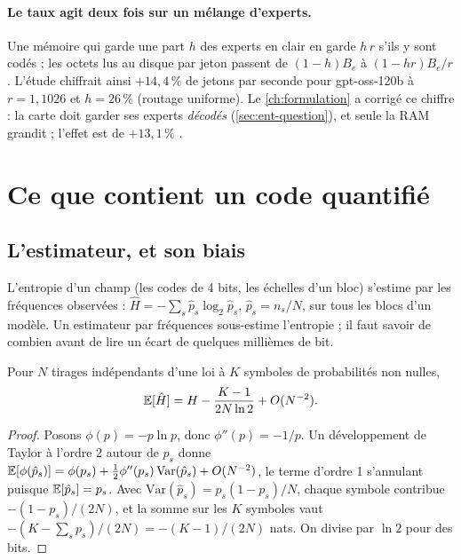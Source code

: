 \paragraph{Le taux agit deux fois sur un mélange d'experts.} Une mémoire qui garde une part $h$ des experts en clair en garde $h\,r$ s'ils y sont codés ; les octets lus au disque par jeton passent de $(1-h)B_e$ à $(1-hr)B_e/r$. L'étude chiffrait ainsi $+14{,}4\,\%$ de jetons par seconde pour gpt-oss-120b à $r = 1{,}1026$ et $h = 26\,\%$ (routage uniforme).  Le \cref{ch:formulation} a corrigé ce chiffre : la carte doit garder ses experts \emph{décodés} (\cref{sec:ent-question}), et seule la RAM grandit ; l'effet est de $+13{,}1\,\%$ \calc.

\section{Ce que contient un code quantifié}\label{sec:ent-contenu}

\subsection{L'estimateur, et son biais}

L'entropie d'un champ (les codes de 4 bits, les échelles d'un bloc) s'estime par les fréquences observées : $\hat H = -\sum_s \hat p_s \log_2 \hat p_s$, $\hat p_s = n_s/N$, sur tous les blocs d'un modèle. Un estimateur par fréquences sous-estime l'entropie ; il faut savoir de combien avant de lire un écart de quelques millièmes de bit.

\begin{lemme}\label{lem:biais-entropie}
Pour $N$ tirages indépendants d'une loi à $K$ symboles de probabilités non nulles,
\begin{equation}\label{eq:biais}
\mathbb{E}[\hat H] = H - \frac{K - 1}{2N\ln 2} + O(N^{-2}).
\end{equation}
\end{lemme}

\begin{proof}
Posons $\phi(p) = -p \ln p$, donc $\phi''(p) = -1/p$. Un développement de Taylor à l'ordre 2 autour de $p_s$ donne $\mathbb{E}[\phi(\hat p_s)] = \phi(p_s) + \tfrac12 \phi''(p_s)\,\mathrm{Var}(\hat p_s) + O(N^{-2})$, le terme d'ordre 1 s'annulant puisque $\mathbb{E}[\hat p_s] = p_s$. Avec $\mathrm{Var}(\hat p_s) = p_s(1-p_s)/N$, chaque symbole contribue $-(1-p_s)/(2N)$, et la somme sur les $K$ symboles vaut $-(K - \sum_s p_s)/(2N) = -(K-1)/(2N)$ nats. On divise par $\ln 2$ pour des bits.
\end{proof}


